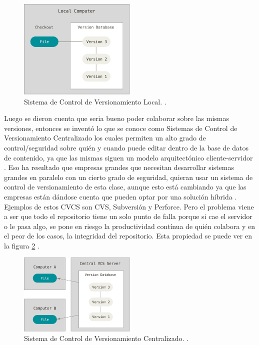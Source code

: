 \begin{figure}
  \begin{center}
    \includegraphics[width=0.5\textwidth]{Figures/lvcs.png}
  \end{center}
  \caption{Sistema de Control de Versionamiento Local. \citep{PROGIT-Git-VCS}.}
  \label{LVCS}
\end{figure}
Luego se dieron cuenta que seria bueno poder colaborar sobre las mismas versiones, entonces se inventó lo que se conoce como Sistemas de Control de Versionamiento Centralizado los cuales permiten un alto grado de control/seguridad sobre quién y cuando puede editar dentro de la base de datos de contenido, ya que las mismas siguen un modelo arquitectónico cliente-servidor \citep{PROGIT-Git-VCS}. Eso ha resultado que empresas grandes que necesitan desarrollar sistemas grandes en paralelo con un cierto grado de seguridad, quieran usar un sistema de control de versionamiento de esta clase, aunque esto está cambiando ya que las empresas están dándose cuenta que pueden optar por una solución híbrida \citep{CollabNet-Dist-or-Cent}. Ejemplos de estos CVCS son CVS, Subversión y Perforce. Pero el problema viene a ser que todo el repositorio tiene un solo punto de falla porque si cae el servidor o le pasa algo, se pone en riesgo la productividad contínua de quién colabora y en el peor de los casos, la integridad del repositorio. Esta propiedad se puede ver en la figura \ref{CVCS} \citep{PROGIT-Git-VCS}.

\begin{figure}
  \begin{center}
  	\includegraphics[width=0.5\textwidth]{Figures/cvcs.png}
  \end{center}
  \caption{Sistema de Control de Versionamiento Centralizado. \citep{PROGIT-Git-VCS}.}
  \label{CVCS}
\end{figure}

